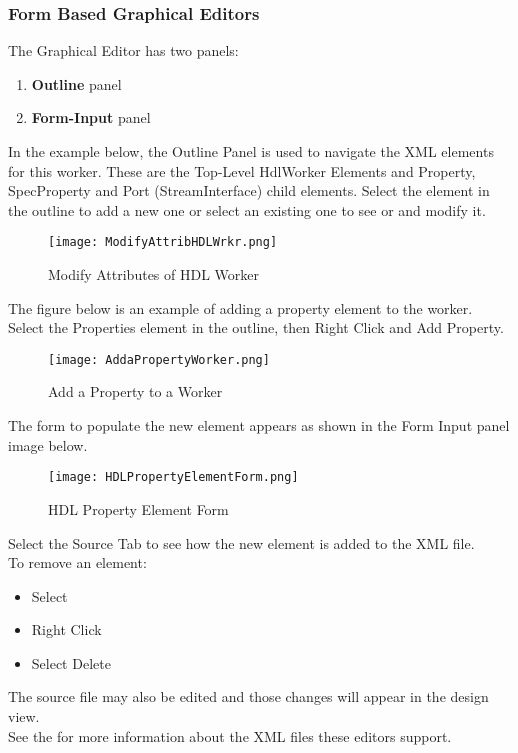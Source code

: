 \documentclass[10pt, a4paper, oneside]{article}
\begin{document}
\subsubsection{Form Based Graphical Editors}
The Graphical Editor has two panels:
\begin{enumerate}
\item \textbf{Outline} panel
\item \textbf{Form-Input} panel
\end{enumerate}
In the example below, the Outline Panel is used to navigate the XML elements for this worker. These are the Top-Level HdlWorker Elements and Property, SpecProperty and Port (StreamInterface) child elements. Select the element in the outline to add a new one or select an existing one to see or and modify it.
\begin{figure}[h!]
	\centering
	\caption{Modify Attributes of HDL Worker}\label{fig:ModifyAttributesofHDLWorker}
	\texttt{[image: ModifyAttribHDLWrkr.png]}
 \end{figure}
The figure below is an example of adding a property element to the worker.
Select the Properties element in the outline, then Right Click and Add Property.
\begin{figure}[h!]
	\centering
	\caption{Add a Property to a Worker}\label{fig:AddaPropertyWorker}
	\texttt{[image: AddaPropertyWorker.png]}
 \end{figure}
The form to populate the new element appears as shown in the Form Input panel image below.\\
\begin{figure}[h!]
	\centering
	\caption{HDL Property Element Form}\label{fig:HDLPropertyElementForm}
	\texttt{[image: HDLPropertyElementForm.png]}
 \end{figure}

Select the Source Tab to see how the new element is added to the XML file. \\
To remove an element:
\begin{itemize}
\item Select
\item Right Click
\item Select Delete
\end{itemize}
The source file may also be edited and those changes will appear in the design view.\\

See the  for more information about the XML files these editors support. \\
\end{document}
